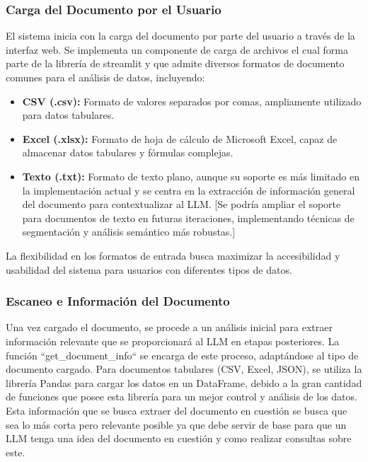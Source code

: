 \subsubsection{Carga del Documento por el Usuario}

El sistema inicia con la carga del documento por parte del usuario a través de la interfaz web. Se implementa un componente de carga de archivos el cual forma parte de la librería de streamlit y que admite diversos formatos de documento comunes para el análisis de datos, incluyendo:
\begin{itemize}
	\item \textbf{CSV (.csv):}  Formato de valores separados por comas, ampliamente utilizado para datos tabulares.
	\item \textbf{Excel (.xlsx):}  Formato de hoja de cálculo de Microsoft Excel, capaz de almacenar datos tabulares y fórmulas complejas.
	\item \textbf{Texto (.txt):}  Formato de texto plano, aunque su soporte es más limitado en la implementación actual y se centra en la extracción de información general del documento para contextualizar al LLM.  [Se podría ampliar el soporte para documentos de texto en futuras iteraciones, implementando técnicas de segmentación y análisis semántico más robustas.]
\end{itemize}

La flexibilidad en los formatos de entrada busca maximizar la accesibilidad y usabilidad del sistema para usuarios con diferentes tipos de datos.

\subsubsection{Escaneo e Información del Documento}

Una vez cargado el documento, se procede a un análisis inicial para extraer información relevante que se proporcionará al LLM en etapas posteriores. La función ``get\_document\_info`` se encarga de este proceso, adaptándose al tipo de documento cargado.  Para documentos tabulares (CSV, Excel, JSON), se utiliza la librería Pandas para cargar los datos en un DataFrame, debido a la gran cantidad de funciones que posee esta librería para un mejor control y análisis de los datos. Esta información que se busca extraer del documento en cuestión se busca que sea lo más corta pero relevante posible ya que debe servir de base para que un LLM tenga una idea del documento en cuestión y como realizar consultas sobre este.

